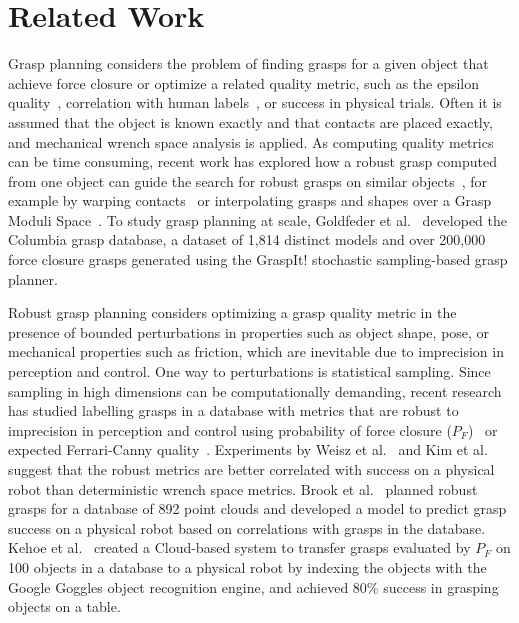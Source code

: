 \section{Related Work}

Grasp planning considers the problem of finding grasps for a given object that achieve force closure or optimize a related quality metric, such as the epsilon quality~\cite{pokorny2013c}, correlation with human labels~\cite{balasubramanian2012physical, kappler2015leveraging}, or success in physical trials.
Often it is assumed that the object is known exactly and that contacts are placed exactly, and mechanical wrench space analysis is applied.
As computing quality metrics can be time consuming, recent work has explored how a robust grasp computed from one object can guide the search for robust grasps on similar objects~\cite{bohg2014data}, for example by warping contacts~\cite{stouraitis2015functional} or interpolating grasps and shapes over a Grasp Moduli Space~\cite{pokorny2013grasp}.
To study grasp planning at scale, Goldfeder et al.~\cite{goldfeder2009columbia, goldfeder2011data} developed the Columbia grasp database, a dataset of 1,814 distinct models and over 200,000 force closure grasps generated using the GraspIt! stochastic sampling-based grasp planner.

Robust grasp planning considers optimizing a grasp quality metric in the presence of bounded perturbations in properties such as object shape, pose, or mechanical properties such as friction, which are inevitable due to imprecision in perception and control.
One way to perturbations is statistical sampling.
Since sampling in high dimensions can be computationally demanding, recent research has studied labelling grasps in a database with metrics that are robust to imprecision in perception and control using probability of force closure ($P_F$)~\cite{weisz2012pose} or expected Ferrari-Canny quality~\cite{kim2012physically}.
Experiments by Weisz et al.~\cite{weisz2012pose} and Kim et al.~\cite{kim2012physically} suggest that the robust metrics are better correlated with success on a physical robot than deterministic wrench space metrics.
Brook et al.~\cite{brook2011collaborative} planned robust grasps for a database of 892 point clouds and developed a model to predict grasp success on a physical robot based on correlations with grasps in the database.   
Kehoe et al.~\cite{kehoe2013cloud} created a Cloud-based system to transfer grasps evaluated by $P_F$ on 100 objects in a database to a physical robot by indexing the objects with the Google Goggles object recognition engine, and achieved 80\% success in grasping objects on a table.

